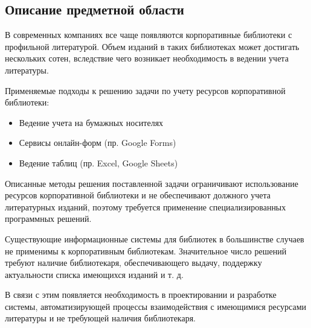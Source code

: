 \documentclass[./intro.tex]{subfiles}
\begin{document}
\subsection{Описание предметной области}
\par 
В современных компаниях все чаще появляются корпоративные библиотеки с профильной литературой.
Объем изданий в таких библиотеках может достигать нескольких сотен, вследствие чего возникает необходимость в ведении учета литературы.
\par
Применяемые подходы к решению задачи по учету ресурсов корпоративной библиотеки:
\begin{itemize}
    \item Ведение учета на бумажных носителях
    \item Сервисы онлайн-форм (пр. Google Forms)
    \item Ведение таблиц (пр. Excel, Google Sheets)
\end{itemize}
\par Описанные методы решения поставленной задачи ограничивают использование ресурсов корпоративной библиотеки и не обеспечивают должного учета литературных изданий, поэтому требуется применение специализированных программных решений.
\par 
Существующие информационные системы для библиотек в большинстве случаев не применимы к корпоративным библиотекам.
Значительное число решений требуют наличие библиотекаря, обеспечивающего выдачу, поддержку актуальности списка имеющихся изданий и т. д.
\par
В связи с этим появляется необходимость в проектировании и разработке системы, автоматизирующей процессы взаимодействия с имеющимися ресурсами литературы и не требующей наличия библиотекаря.
\par
\end{document}
